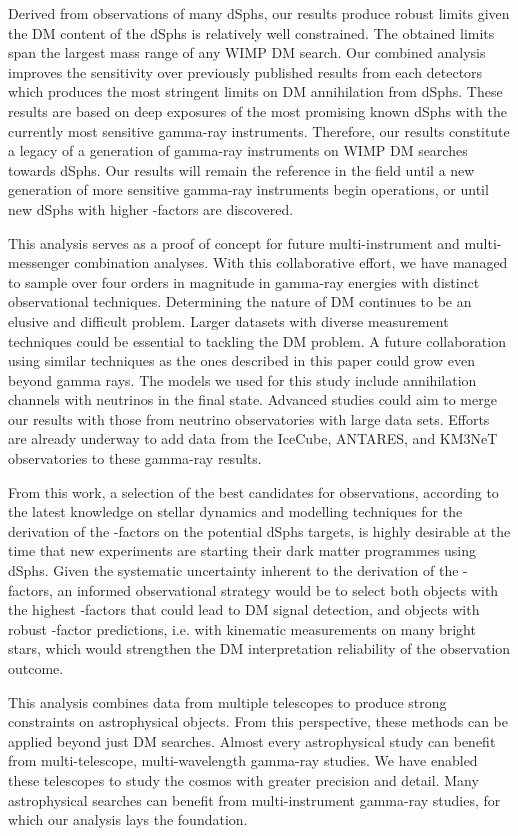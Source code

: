 Derived from observations of many dSphs, our results produce robust limits given the DM content of the dSphs is relatively well constrained.
The obtained limits span the largest mass range of any WIMP DM search.
Our combined analysis improves the sensitivity over previously published results from each detectors which produces the most stringent limits on DM annihilation from dSphs.
These results are based on deep exposures of the most promising known dSphs with the currently most sensitive gamma-ray instruments.
Therefore, our results constitute a legacy of a generation of gamma-ray instruments on WIMP DM searches towards dSphs.
Our results will remain the reference in the field until a new generation of more sensitive gamma-ray instruments begin operations, or until new dSphs with higher \J-factors are discovered.

This analysis serves as a proof of concept for future multi-instrument and multi-messenger combination analyses.
With this collaborative effort, we have managed to sample over four orders in magnitude in gamma-ray energies with distinct observational techniques.
Determining the nature of DM continues to be an elusive and difficult problem.
Larger datasets with diverse measurement techniques could be essential to tackling the DM problem.
A future collaboration using similar techniques as the ones described in this paper could grow even beyond gamma rays.
The models we used for this study include annihilation channels with neutrinos in the final state.
Advanced studies could aim to merge our results with those from neutrino observatories with large data sets.
Efforts are already underway to add data from the IceCube, ANTARES, and KM3NeT observatories to these gamma-ray results.

From this work, a selection of the best candidates for observations, according to the latest knowledge on stellar dynamics and modelling techniques for the derivation of the \J-factors on the potential dSphs targets, is highly desirable at the time that new experiments are starting their dark matter programmes using dSphs.
Given the systematic uncertainty inherent to the derivation of the \J-factors,
an informed observational strategy would be to select both objects with the highest \J-factors that could lead to DM signal detection, and objects with robust \J-factor predictions, i.e. with kinematic measurements on many bright stars, which would strengthen the DM interpretation reliability of the observation outcome.

This analysis combines data from multiple telescopes to produce strong constraints on astrophysical objects.
From this perspective, these methods can be applied beyond just DM searches.
Almost every astrophysical study can benefit from multi-telescope, multi-wavelength gamma-ray studies.
We have enabled these telescopes to study the cosmos with greater precision and detail.
Many astrophysical searches can benefit from multi-instrument gamma-ray studies, for which our analysis lays the foundation.